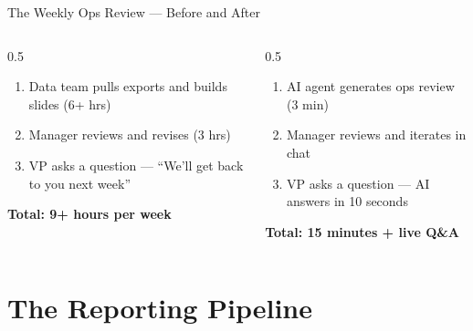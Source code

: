 \documentclass[aspectratio=169]{beamer}
\begin{document}
\begin{frame}{The Weekly Ops Review --- Before and After}
\begin{columns}[T]
\begin{column}{0.5\textwidth}
\begin{shadedbox}[title=\textbf{Before: The Dashboard Era}]
\begin{enumerate}\small
  \item Data team pulls exports and builds slides (6+ hrs)
  \item Manager reviews and revises (3 hrs)
  \item VP asks a question --- ``We'll get back to you next week''
\end{enumerate}
\vspace{0.2cm}
\centering\small\textbf{Total: 9+ hours per week}
\end{shadedbox}
\end{column}
\begin{column}{0.5\textwidth}
\begin{shadedbox}[title=\textbf{After: Natural Language AI}]
\begin{enumerate}\small
  \item AI agent generates ops review (3 min)
  \item Manager reviews and iterates in chat
  \item VP asks a question --- \alert{AI answers in 10 seconds}
\end{enumerate}
\vspace{0.2cm}
\centering\small\textbf{Total: 15 minutes + live Q\&A}
\end{shadedbox}
\end{column}
\end{columns}
\end{frame}

\section{The Reporting Pipeline}
\end{document}
